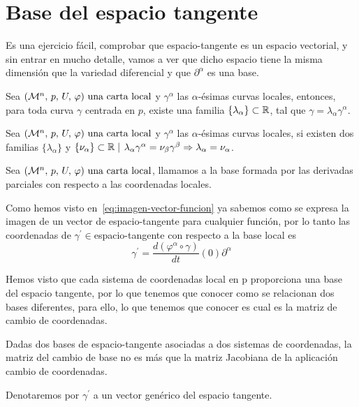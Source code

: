 \section{Base del espacio tangente}\label{sec:base-espacio-tangente}

Es una ejercicio fácil, comprobar que \gls{espacio-tangente} es un espacio vectorial, y sin entrar en mucho
detalle, vamos a ver que dicho espacio tiene la misma dimensión que la variedad diferencial y que ${\partial^\alpha}$ es una base.

\begin{result}
  Sea $(\mathcal{M}^n,\thinspace p,\thinspace U,\thinspace \varphi)\textmd{ una carta local}$ y ${\gamma^\alpha}$ las $\alpha$-ésimas curvas locales, entonces, para toda curva $\gamma$
  centrada en $p$, existe una familia $\{\lambda_\alpha\}\subset\mathbb{R}$, tal que $\gamma=\lambda_\alpha\gamma^\alpha$.
\end{result}

\begin{result}
  Sea $(\mathcal{M}^n,\thinspace p,\thinspace U,\thinspace \varphi)\textmd{ una carta local}$ y ${\gamma^\alpha}$ las $\alpha$-ésimas curvas locales, si existen dos familias
  $\{\lambda_\alpha\}$ y $\{\nu_\alpha\}\subset\mathbb{R}\mid$
  $\lambda_\alpha\gamma^\alpha=\nu_\beta\gamma^\beta\Rightarrow\lambda_\alpha=\nu_\alpha$.
\end{result}

\begin{definition}
  Sea $(\mathcal{M}^n,\thinspace p,\thinspace U,\thinspace \varphi)\textmd{ una carta local}$, llamamos  a la base
  formada por las derivadas parciales con respecto a las coordenadas locales.
\end{definition}

Como hemos visto en~\ref{eq:imagen-vector-funcion} ya sabemos como se expresa la imagen de un vector de
\gls{espacio-tangente} para cualquier función, por lo tanto las coordenadas de $\gamma^{'}\in$\gls{espacio-tangente}
con respecto a la base local es
\begin{equation}\label{eq:vector-tangente-coordenadas-locales}
\gamma^{'}=\frac{d(\varphi^\alpha\circ\gamma)}{dt}(0)\partial^\alpha
\end{equation}

Hemos visto que cada sistema de coordenadas local en p proporciona una base del espacio tangente, por lo que tenemos
que conocer como se relacionan dos bases diferentes, para ello, lo que tenemos que conocer es cual es la matriz de
cambio de coordenadas.

\begin{result}
  Dadas dos bases de \gls{espacio-tangente} asociadas a dos sistemas de coordenadas, la matriz del cambio de base no es
  más que la matriz Jacobiana de la aplicación cambio de coordenadas.
\end{result}

\begin{notation}
  Denotaremos por $\gamma^{'}$ a un vector genérico del espacio tangente.
\end{notation}